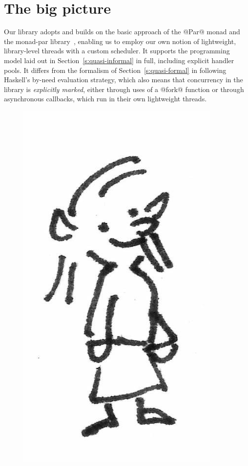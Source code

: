 \section{The big picture}\label{s:lvish-big-picture}

Our library adopts and builds on the basic approach of the @Par@ monad
and the monad-par library~\cite{monad-par}, enabling us to employ our
own notion of lightweight, library-level threads with a custom
scheduler.  It supports the programming model laid out in
Section~\ref{s:quasi-informal} in full, including explicit handler
pools.  It differs from the formalism of Section~\ref{s:quasi-formal}
in following Haskell's by-need evaluation strategy, which also means
that concurrency in the library is \emph{explicitly marked}, either
through uses of a @fork@ function or through asynchronous callbacks,
which run in their own lightweight threads.

\ifdefined\DISSERTATION
\begin{figure}
\vspace{-2em}
\begin{center}
  \includegraphics[scale=0.2]{../illustrations/elf}
\end{center}
\vspace{-1.5em}
\end{figure}
\fi

